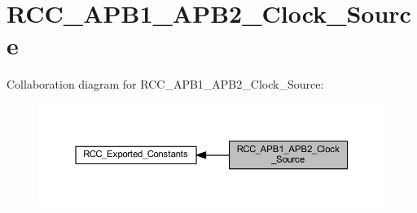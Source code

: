 \hypertarget{group___r_c_c___a_p_b1___a_p_b2___clock___source}{}\section{R\+C\+C\+\_\+\+A\+P\+B1\+\_\+\+A\+P\+B2\+\_\+\+Clock\+\_\+\+Source}
\label{group___r_c_c___a_p_b1___a_p_b2___clock___source}
Collaboration diagram for R\+C\+C\+\_\+\+A\+P\+B1\+\_\+\+A\+P\+B2\+\_\+\+Clock\+\_\+\+Source\+:
\nopagebreak
\begin{figure}[H]
\begin{center}
\leavevmode
\includegraphics[width=350pt]{group___r_c_c___a_p_b1___a_p_b2___clock___source}
\end{center}
\end{figure}
